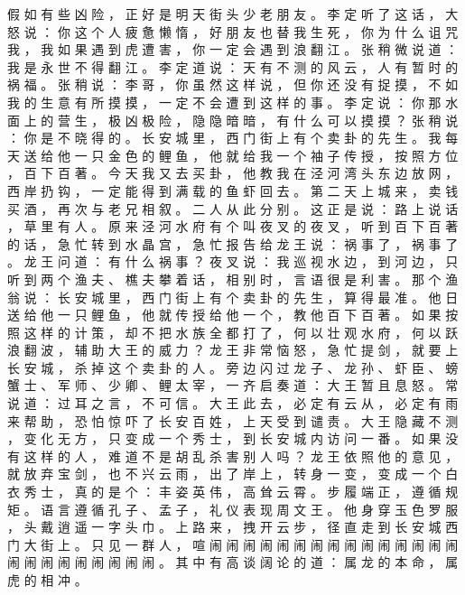 {假 如 有 些 凶 险 ， 正 好 是 明 天 街 头 少 老 朋 友 。
李 定 听 了 这 话 ， 大 怒 说 ： 你 这 个 人 疲 惫 懒 惰 ， 好 朋 友 也 替 我 生 死 ， 你 为 什 么 诅 咒 我 ， 我 如 果 遇 到 虎 遭 害 ， 你 一 定 会 遇 到 浪 翻 江 。
张 稍 微 说 道 ： 我 是 永 世 不 得 翻 江 。
李 定 道 说 ： 天 有 不 测 的 风 云 ， 人 有 暂 时 的 祸 福 。
张 稍 说 ： 李 哥 ， 你 虽 然 这 样 说 ， 但 你 还 没 有 捉 摸 ， 不 如 我 的 生 意 有 所 摸 摸 ， 一 定 不 会 遭 到 这 样 的 事 。
李 定 说 ： 你 那 水 面 上 的 营 生 ， 极 凶 极 险 ， 隐 隐 暗 暗 ， 有 什 么 可 以 摸 摸 ？ 张 稍 说 ： 你 是 不 晓 得 的 。
长 安 城 里 ， 西 门 街 上 有 个 卖 卦 的 先 生 。
我 每 天 送 给 他 一 只 金 色 的 鲤 鱼 ， 他 就 给 我 一 个 袖 子 传 授 ， 按 照 方 位 ， 百 下 百 著 。
今 天 我 又 去 买 卦 ， 他 教 我 在 泾 河 湾 头 东 边 放 网 ， 西 岸 扔 钩 ， 一 定 能 得 到 满 载 的 鱼 虾 回 去 。
第 二 天 上 城 来 ， 卖 钱 买 酒 ， 再 次 与 老 兄 相 叙 。
二 人 从 此 分 别 。
这 正 是 说 ： 路 上 说 话 ， 草 里 有 人 。
原 来 泾 河 水 府 有 个 叫 夜 叉 的 夜 叉 ， 听 到 百 下 百 著 的 话 ， 急 忙 转 到 水 晶 宫 ， 急 忙 报 告 给 龙 王 说 ： 祸 事 了 ， 祸 事 了 。 龙 王 问 道 ： 有 什 么 祸 事 ？ 夜 叉 说 ： 我 巡 视 水 边 ， 到 河 边 ， 只 听 到 两 个 渔 夫 、 樵 夫 攀 着 话 ， 相 别 时 ， 言 语 很 是 利 害 。
那 个 渔 翁 说 ： 长 安 城 里 ， 西 门 街 上 有 个 卖 卦 的 先 生 ， 算 得 最 准 。
他 日 送 给 他 一 只 鲤 鱼 ， 他 就 传 授 给 他 一 个 ， 教 他 百 下 百 著 。
如 果 按 照 这 样 的 计 策 ， 却 不 把 水 族 全 都 打 了 ， 何 以 壮 观 水 府 ， 何 以 跃 浪 翻 波 ， 辅 助 大 王 的 威 力 ？ 龙 王 非 常 恼 怒 ， 急 忙 提 剑 ， 就 要 上 长 安 城 ， 杀 掉 这 个 卖 卦 的 人 。
旁 边 闪 过 龙 子 、 龙 孙 、 虾 臣 、 螃 蟹 士 、 军 师 、 少 卿 、 鲤 太 宰 ， 一 齐 启 奏 道 ： 大 王 暂 且 息 怒 。
常 说 道 ： 过 耳 之 言 ， 不 可 信 。
大 王 此 去 ， 必 定 有 云 从 ， 必 定 有 雨 来 帮 助 ， 恐 怕 惊 吓 了 长 安 百 姓 ， 上 天 受 到 谴 责 。
大 王 隐 藏 不 测 ， 变 化 无 方 ， 只 变 成 一 个 秀 士 ， 到 长 安 城 内 访 问 一 番 。
如 果 没 有 这 样 的 人 ， 难 道 不 是 胡 乱 杀 害 别 人 吗 ？ 龙 王 依 照 他 的 意 见 ， 就 放 弃 宝 剑 ， 也 不 兴 云 雨 ， 出 了 岸 上 ， 转 身 一 变 ， 变 成 一 个 白 衣 秀 士 ， 真 的 是 个 ： 丰 姿 英 伟 ， 高 耸 云 霄 。
步 履 端 正 ， 遵 循 规 矩 。
语 言 遵 循 孔 子 、 孟 子 ， 礼 仪 表 现 周 文 王 。
他 身 穿 玉 色 罗 服 ， 头 戴 逍 遥 一 字 头 巾 。
上 路 来 ， 拽 开 云 步 ， 径 直 走 到 长 安 城 西 门 大 街 上 。
只 见 一 群 人 ， 喧 闹 闹 闹 闹 闹 闹 闹 闹 闹 闹 闹 闹 闹 闹 闹 闹 闹 闹 闹 闹 闹 闹 闹 闹 。
其 中 有 高 谈 阔 论 的 道 ： 属 龙 的 本 命 ， 属 虎 的 相 冲 。
}
